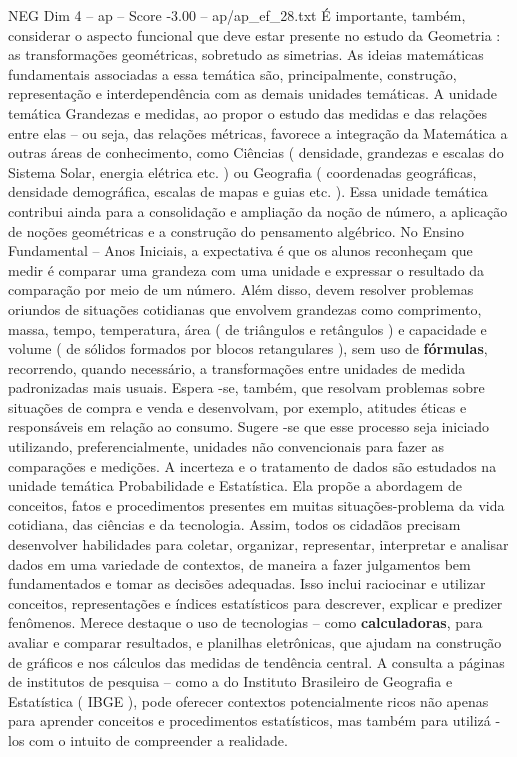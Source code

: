 \begin{textsample}{NEG Dim 4 – ap – Score -3.00 – ap/ap\_ef\_28.txt}
É importante, também, considerar o aspecto funcional que deve estar presente no estudo da Geometria : as transformações geométricas, sobretudo as simetrias.
As ideias matemáticas fundamentais associadas a essa temática são, principalmente, construção, representação e interdependência com as demais unidades temáticas.
A unidade temática Grandezas e medidas, ao propor o estudo das medidas e das relações entre elas – ou seja, das relações métricas, favorece a integração da Matemática a outras áreas de conhecimento, como Ciências ( densidade, grandezas e escalas do Sistema Solar, energia elétrica etc. ) ou Geografia ( coordenadas geográficas, densidade demográfica, escalas de mapas e guias etc. ).
Essa unidade temática contribui ainda para a consolidação e ampliação da noção de número, a aplicação de noções geométricas e a construção do pensamento algébrico.
No Ensino Fundamental – Anos Iniciais, a expectativa é que os alunos reconheçam que medir é comparar uma grandeza com uma unidade e expressar o resultado da comparação por meio de um número.
Além disso, devem resolver problemas oriundos de situações cotidianas que envolvem grandezas como comprimento, massa, tempo, temperatura, área ( de triângulos e retângulos ) e capacidade e volume ( de sólidos formados por blocos retangulares ), sem uso de \textbf{fórmulas}, recorrendo, quando necessário, a transformações entre unidades de medida padronizadas mais usuais.
Espera -se, também, que resolvam problemas sobre situações de compra e venda e desenvolvam, por exemplo, atitudes éticas e responsáveis em relação ao consumo.
Sugere -se que esse processo seja iniciado utilizando, preferencialmente, unidades não convencionais para fazer as comparações e medições.
A incerteza e o tratamento de dados são estudados na unidade temática Probabilidade e Estatística.
Ela propõe a abordagem de conceitos, fatos e procedimentos presentes em muitas situações-problema da vida cotidiana, das ciências e da tecnologia.
Assim, todos os cidadãos precisam desenvolver habilidades para coletar, organizar, representar, interpretar e analisar dados em uma variedade de contextos, de maneira a fazer julgamentos bem fundamentados e tomar as decisões adequadas.
Isso inclui raciocinar e utilizar conceitos, representações e índices estatísticos para descrever, explicar e predizer fenômenos.
Merece destaque o uso de tecnologias – como \textbf{calculadoras}, para avaliar e comparar resultados, e planilhas eletrônicas, que ajudam na construção de gráficos e nos cálculos das medidas de tendência central.
A consulta a páginas de institutos de pesquisa – como a do Instituto Brasileiro de Geografia e Estatística ( IBGE ), pode oferecer contextos potencialmente ricos não apenas para aprender conceitos e procedimentos estatísticos, mas também para utilizá -los com o intuito de compreender a realidade.

\end{textsample}
